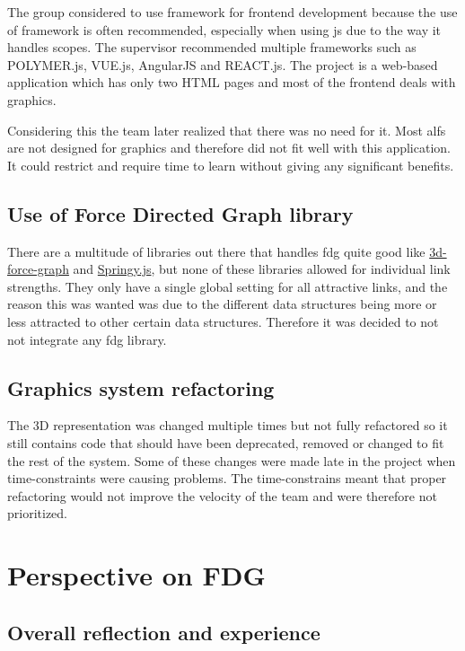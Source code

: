 The group considered to use framework for \gls{frontend} development because the use of framework is often recommended, especially when using \Gls{js} due to the way it handles scopes. The supervisor recommended multiple frameworks such as POLYMER.js, VUE.js, AngularJS and REACT.js. The project is a web-based application which has only two HTML pages and most of the \gls{frontend} deals with graphics.

Considering this the team later realized that there was no need for it. Most \glspl{alf} are not designed for graphics and therefore did not fit well with this application. It could restrict and require time to learn without giving any significant benefits.

\subsection{Use of Force Directed Graph library}
There are a multitude of libraries out there that handles \gls{fdg} quite good like \href{https://www.npmjs.com/package/3d-force-graph}{3d-force-graph} and \href{http://getspringy.com/}{Springy.js}, but none of these libraries allowed for individual link strengths. They only have a single global setting for all attractive links, and the reason this was wanted was due to the different data structures being more or less attracted to other certain data structures. Therefore it was decided to not not integrate any \gls{fdg} library. 

\subsection{Graphics system refactoring}
The 3D representation was changed multiple times but not fully refactored so it still contains code that should have been deprecated, removed or changed to fit the rest of the system. Some of these changes were made late in the project when time-constraints were causing problems. The time-constrains meant that proper refactoring would not improve the velocity of the team and were therefore not prioritized.

\section{Perspective on FDG}
\subsection{Overall reflection and experience}

